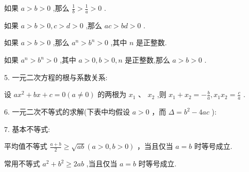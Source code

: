 \documentclass[10pt]{article}
\begin{document}
如果 \(a > b > 0\) ,那么 \(\frac{1}{b} > \frac{1}{a} > 0\) .

如果 \(a > b > 0,c > d > 0\) ,那么 \({ac} > {bd} > 0\) .

如果 \(a > b > 0\) ,那么 \({a}^{n} > {b}^{n} > 0\) ,其中 \(n\) 是正整数.

如果 \({a}^{n} > {b}^{n} > 0\) ,其中 \(a > 0,b > 0,n\) 是正整数,那么 \(a > b > 0\) .

5. 一元二次方程的根与系数关系:

设 \(a{x}^{2} + {bx} + c = 0\left( {a \neq  0}\right)\) 的两根为 \({x}_{1}\text{ 、 }{x}_{2}\) ,则 \({x}_{1} + {x}_{2} =  - \frac{b}{a},{x}_{1}{x}_{2} = \frac{c}{a}\) .

6. 一元二次不等式的求解(下表中均假设 \(a > 0\) ，而 \(\Delta  = {b}^{2} - {4ac}\) ):

\begin{center}
\end{center}



7. 基本不等式:

平均值不等式 \(\frac{a + b}{2} \geq  \sqrt{ab}\left( {a > 0,b > 0}\right)\) ，当且仅当 \(a = b\) 时等号成立.

常用不等式 \({a}^{2} + {b}^{2} \geq  {2ab}\) ,当且仅当 \(a = b\) 时等号成立.
\end{document}
